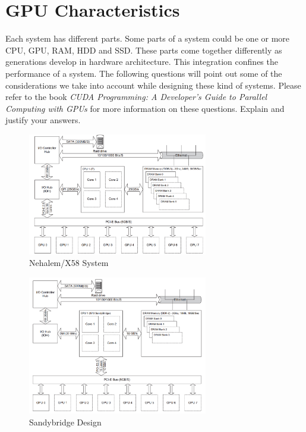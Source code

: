 \documentclass[12pt]{article}
\numberwithin{equation}{section}
\numberwithin{table}{section}
\numberwithin{figure}{section}
\begin{document}
\section{GPU Characteristics}
Each system has different parts. Some parts of a system could be one or more CPU, GPU, RAM, HDD and SSD. These parts come together differently as generations develop in hardware architecture. This integration confines the performance of a system. The following questions will point out some of the considerations we take into account while designing these kind of systems. Please refer to the book \textit{CUDA Programming: A Developer's Guide to Parallel Computing with GPUs} for more information on these questions. Explain and justify your answers.\\
\begin{figure}[!h]\centering
	\includegraphics[width=0.7\textwidth]{1_1.PNG}
	\caption{Nehalem/X58 System}
	\label{pl1}
\end{figure}
\begin{figure}[!h]\centering
	\includegraphics[width=0.7\textwidth]{1_2.PNG}
	\caption{Sandybridge Design}
	\label{pl1}
\end{figure}
\end{document}
